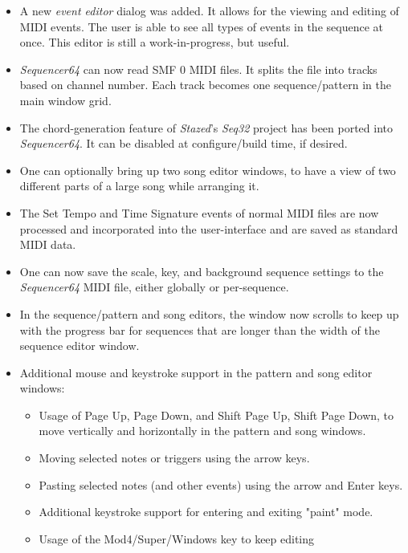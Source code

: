 \documentclass[
 11pt,
 twoside,
 a4paper,
 headinclude,
 footinclude,
 final                                 %
]{article}
\begin{document}
   \begin{itemize}
      \item A new \textsl{event editor} dialog was added.
         It allows for the viewing and editing of MIDI events.
         The user is able to see all types of events in the sequence at
         once.  This editor is still a work-in-progress, but useful.
      \item \textsl{Sequencer64} can now read SMF 0 MIDI files.  It splits
         the file into tracks based on channel number.  Each track becomes one
         sequence/pattern in the main window grid.
      \item The chord-generation feature of \textsl{Stazed}'s \textsl{Seq32}
         project has been ported into \textsl{Sequencer64}.  It can be
         disabled at configure/build time, if desired.
      \item One can optionally bring up two song editor windows, to have a view
         of two different parts of a large song while arranging it.
      \item The Set Tempo and Time Signature events of normal MIDI files are
         now processed and incorporated into the user-interface and are saved
         as standard MIDI data.
      \item One can now save the scale, key, and background sequence
         settings to the \textsl{Sequencer64} MIDI file, either globally or
         per-sequence.
      \item In the sequence/pattern and song editors, the window now scrolls to
         keep up with the progress bar for sequences that are longer than the
         width of the sequence editor window.
      \item Additional mouse and keystroke support in the pattern and song
         editor windows:
      \begin{itemize}
         \item Usage of Page Up, Page Down, and Shift Page Up, Shift Page Down,
            to move vertically and horizontally in the pattern and song
            windows.
         \item Moving selected notes or triggers using the arrow keys.
         \item Pasting selected notes (and other events) using the arrow and
            Enter keys.
         \item Additional keystroke support for entering and exiting "paint"
            mode.
         \item Usage of the Mod4/Super/Windows key to keep editing

\end{itemize}
\end{itemize}
\end{document}
